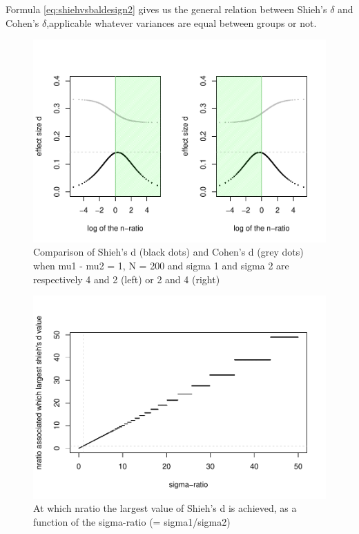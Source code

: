 \documentclass[man]{apa6}
\begin{document}
Formula \ref{eq:shiehvsbaldesign2} gives us the general relation between Shieh's \(\delta\) and Cohen's \(\delta\),applicable whatever variances are equal between groups or not.

\begin{figure}
\centering
\includegraphics{Appendix1_files/figure-latex/SHIEH4-1.pdf}
\caption{\label{fig:SHIEH4}Comparison of Shieh's d (black dots) and Cohen's d (grey dots) when mu1 - mu2 = 1, N = 200 and sigma 1 and sigma 2 are respectively 4 and 2 (left) or 2 and 4 (right)}
\end{figure}

\begin{figure}
\centering
\includegraphics{Appendix1_files/figure-latex/SHIEH5-1.pdf}
\caption{\label{fig:SHIEH5}At which nratio the largest value of Shieh's d is achieved, as a function of the sigma-ratio (= sigma1/sigma2)}
\end{figure}
\end{document}
